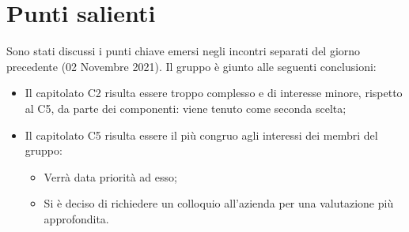 \documentclass[11pt]{article}
\begin{document}
	\newpage

	\section{Punti salienti}
		Sono stati discussi i punti chiave emersi negli incontri separati del giorno precedente (02 Novembre 2021).
		Il gruppo è giunto alle seguenti conclusioni:
		\begin{itemize}
			\item Il capitolato C2 risulta essere troppo complesso e di interesse minore, rispetto al C5,
			da parte dei componenti: viene tenuto come seconda scelta;
			\item Il capitolato C5 risulta essere il più congruo agli interessi dei membri del gruppo:
			\begin{itemize}
				\item Verrà data priorità ad esso;
				\item Si è deciso di richiedere un colloquio all'azienda per una valutazione più approfondita.
			\end{itemize}
		\end{itemize}
\end{document}

